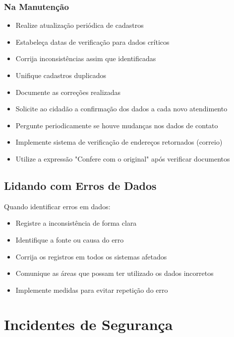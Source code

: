 \documentclass[12pt,a4paper]{article}
\begin{document}
\subsubsection{Na Manutenção}
\begin{itemize}
    \item Realize atualização periódica de cadastros
    \item Estabeleça datas de verificação para dados críticos
    \item Corrija inconsistências assim que identificadas
    \item Unifique cadastros duplicados
    \item Documente as correções realizadas
\end{itemize}

\begin{tcolorbox}[colback=verdeclaro, colframe=green!75!black, title=Boas Práticas]
\begin{itemize}
    \item Solicite ao cidadão a confirmação dos dados a cada novo atendimento
    \item Pergunte periodicamente se houve mudanças nos dados de contato
    \item Implemente sistema de verificação de endereços retornados (correio)
    \item Utilize a expressão "Confere com o original" após verificar documentos
\end{itemize}
\end{tcolorbox}

\subsection{Lidando com Erros de Dados}
Quando identificar erros em dados:
\begin{itemize}
    \item Registre a inconsistência de forma clara
    \item Identifique a fonte ou causa do erro
    \item Corrija os registros em todos os sistemas afetados
    \item Comunique as áreas que possam ter utilizado os dados incorretos
    \item Implemente medidas para evitar repetição do erro
\end{itemize}

\newpage
\section{Incidentes de Segurança}
\end{document}
